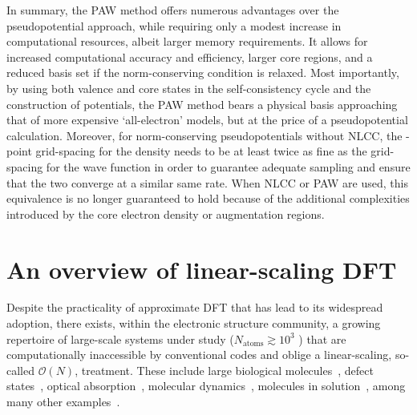 In summary, the PAW method 
offers numerous advantages over the 
pseudopotential approach, 
while requiring only a modest increase 
in computational resources, 
albeit larger memory requirements.
%
It allows for increased computational 
accuracy and efficiency, 
larger core regions, 
and a reduced basis set 
if the norm-conserving condition is relaxed. 
%
{
Most importantly, 
by using both valence and core 
states in the self-consistency cycle 
and the construction of potentials, 
the PAW method bears a physical basis  
approaching that of more expensive `all-electron' models, 
but at the price of a pseudopotential calculation.}
%
{
Moreover, 
for norm-conserving pseudopotentials without NLCC, 
the {\bk}-point grid-spacing for the density
needs to be at least twice as fine 
as the grid-spacing for the wave function 
in order to guarantee adequate sampling 
and ensure that the two converge at 
a similar same rate.
%
When NLCC or PAW are used, 
this equivalence is no longer guaranteed to hold 
because of the additional complexities 
introduced by the core electron density 
or augmentation regions.}



\section{An overview of linear-scaling DFT}
\label{sec:linear_scaling_dft}

{
Despite the practicality of approximate DFT 
that has lead to its widespread adoption,  
there exists, within the electronic structure community, 
a growing repertoire of large-scale systems under study 
($N_\textrm{atoms}\gtrsim10^3$ )
that are computationally inaccessible 
by conventional codes 
and oblige a linear-scaling,
so-called $\mathcal{O}(N)$, treatment.
%
These include 
large biological molecules~\cite{skylaris2005introducing,doi:10.1021/jz3004188,Weber22042014,doi:10.1021/jz5018703,PROT:PROT24686},
defect states~\cite{PhysRevB.79.024112,hine2010linear,PhysRevB.84.035209}, 
optical absorption~\cite{PhysRevB.84.165131,C3CP52043A}, 
molecular dynamics~\cite{doi:10.1063/1.4978684,PhysRevB.83.195102}, 
molecules in solution~\cite{doi:10.1021/acs.jctc.5b00391,0295-5075-95-4-43001},  
among many other examples~\cite{PhysRevLett.108.256402,HINE20091041,doi:10.1063/1.4817001,0953-8984-28-7-074003}.}

